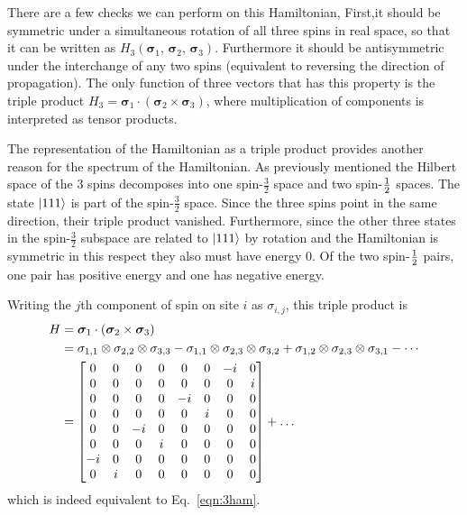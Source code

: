 There are a few checks we can perform on this Hamiltonian, First,it should be symmetric under a simultaneous rotation of all three spins in real space, so that it can be written as $H_3(\bm{\sigma}_1,\,\bm{\sigma}_2 ,\,\bm{\sigma}_3)$. Furthermore it should be antisymmetric under the interchange of any two spins (equivalent to reversing the direction of propagation). The only function of three vectors that has this property is the triple product $H_3= \bm{\sigma}_1\cdot\left(\bm{\sigma}_2 \times\bm{\sigma}_3\right)$, where multiplication of components is interpreted as tensor products.

The representation of the Hamiltonian as a triple product provides another reason for the spectrum of the Hamiltonian. As previously mentioned the Hilbert space of the 3 spins decomposes into one spin-$\frac{3}{2}$ space and two spin-$\frac{1}{2}$ spaces. The state $\left|111\right\rangle$ is part of the spin-$\frac{3}{2}$ space. Since the three spins point in the same direction, their triple product vanished. Furthermore, since the other three states in the spin-$\frac{3}{2}$ subspace are related to $\left|111\right\rangle$ by rotation and the Hamiltonian is symmetric in this respect they also must have energy 0. Of the two spin-$\frac{1}{2}$ pairs, one pair has positive energy and one has negative energy.

Writing the $j$th component of spin on site $i$ as $\sigma_{i,j}$, this triple product is
\begin{align}
H &= \bm{\sigma}_1\cdot\left(\bm{\sigma}_2 \times\bm{\sigma}_3\right) \nonumber\\
&= \sigma_{1,1}\otimes\sigma_{2,2}\otimes{\sigma}_{3,3} - {\sigma}_{1,1}
	\otimes\sigma_{2,3}\otimes\sigma_{3,2} + \sigma_{1,2}\otimes{\sigma}_{2,3} \otimes {\sigma}_{3,1}-\cdots\nonumber\\
&= \begin{bmatrix}
	0 & 0 & 0 & 0 & 0 & 0 &-i & 0 \\
	0 & 0 & 0 & 0 & 0 & 0 & 0 & i \\
	0 & 0 & 0 & 0 &-i & 0 & 0 & 0 \\
	0 & 0 & 0 & 0 & 0 & i & 0 & 0 \\
	0 & 0 &-i & 0 & 0 & 0 & 0 & 0 \\
	0 & 0 & 0 & i & 0 & 0 & 0 & 0 \\
	-i& 0 & 0 & 0 & 0 & 0 & 0 & 0 \\
	0 & i & 0 & 0 & 0 & 0 & 0 & 0
	\end{bmatrix} + \dots
\end{align}
which is indeed equivalent to Eq.~\ref{eqn:3ham}.


